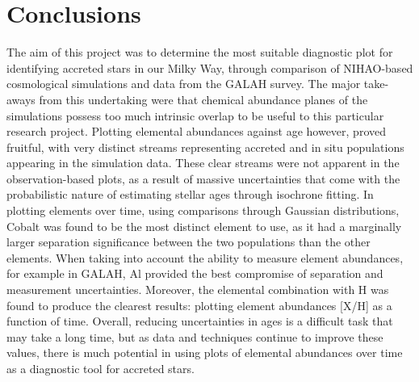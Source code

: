 \documentclass[fleqn,usenatbib]{mnras}
\begin{document}
\section{Conclusions}
\label{sec:conc}
The aim of this project was to determine the most suitable diagnostic plot for identifying accreted stars in our Milky Way, through comparison of NIHAO-based cosmological simulations and data from the GALAH survey. The major take-aways from this undertaking were that chemical abundance planes of the simulations possess too much intrinsic overlap to be useful to this particular research project. Plotting elemental abundances against age however, proved fruitful, with very distinct streams representing accreted and in situ populations appearing in the simulation data. These clear streams were not apparent in the observation-based plots, as a result of massive uncertainties that come with the probabilistic nature of estimating stellar ages through isochrone fitting.  
In plotting elements over time, using comparisons through Gaussian distributions, Cobalt was found to be the most distinct element to use, as it had a marginally larger separation significance between the two populations than the other elements. When taking into account the ability to measure element abundances, for example in GALAH, Al provided the best compromise of separation and measurement uncertainties. Moreover, the elemental combination with H was found to produce the clearest results: plotting element abundances [X/H] as a function of time. Overall, reducing uncertainties in ages is a difficult task that may take a long time, but as data and techniques continue to improve these values, there is much potential in using plots of elemental abundances over time as a diagnostic tool for accreted stars. 



\end{document}
